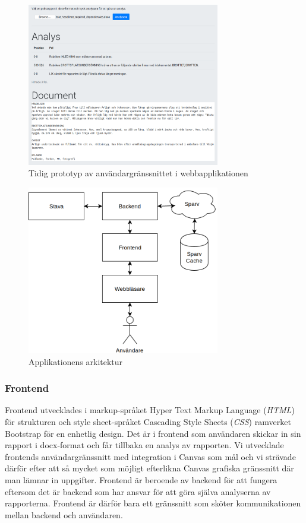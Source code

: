 \documentclass[swedish]{maucsthesis}
\begin{document}
\begin{figure}[H]
    \centering
    \includegraphics[width=0.75\textwidth]{tidigprototyp.png}
    \caption{Tidig prototyp av användargränssnittet i webbapplikationen}
    \label{fig:tidigprototyp}
\end{figure}

\begin{figure}[H]
    \centering
    \includegraphics[width=0.75\textwidth]{architecture.png}
    \caption{Applikationens arkitektur}
    \label{fig:architecture}
\end{figure}

\subsubsection{Frontend}

Frontend utvecklades i markup-språket Hyper Text Markup Language (\textit{HTML}) för
strukturen och style sheet-språket Cascading Style Sheets (\textit{CSS}) ramverket
Bootstrap för en enhetlig design. Det är i frontend som användaren skickar in
sin rapport i docx-format och får tillbaka en analys av rapporten. Vi utvecklade
frontends användargränssnitt med integration i Canvas som mål och vi strävade
därför efter att så mycket som möjligt efterlikna Canvas grafiska gränssnitt
där man lämnar in uppgifter. Frontend är beroende av backend för att fungera
eftersom det är backend som har ansvar för att göra själva analyserna av
rapporterna. Frontend är därför bara ett gränssnitt som sköter kommunikationen
mellan backend och användaren.
\end{document}
